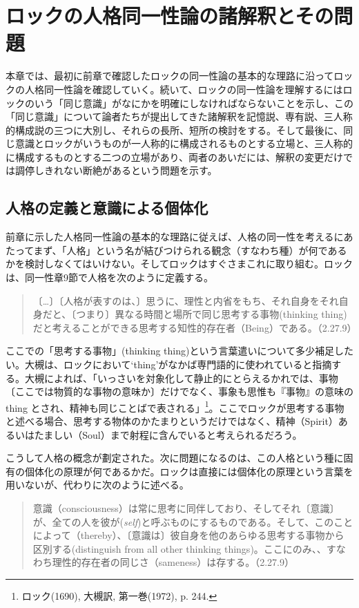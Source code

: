 \documentclass[a4j,oneside]{jsbook}
\begin{document}
\chapter{
ロックの人格同一性論の諸解釈とその問題
}
本章では、最初に前章で確認したロックの同一性論の基本的な理路に沿ってロックの人格同一性論を確認していく。続いて、ロックの同一性論を理解するにはロックのいう「同じ意識」がなにかを明確にしなければならないことを示し、この「同じ意識」について論者たちが提出してきた諸解釈を記憶説、専有説、三人称的構成説の三つに大別し、それらの長所、短所の検討をする。そして最後に、同じ意識とロックがいうものが一人称的に構成されるものとする立場と、三人称的に構成するものとする二つの立場があり、両者のあいだには、解釈の変更だけでは調停しきれない断絶があるという問題を示す。
\section{
人格の定義と意識による個体化
}
前章に示した人格同一性論の基本的な理路に従えば、人格の同一性を考えるにあたってまず、「人格」という名が結びつけられる観念（すなわち種）が何であるかを検討しなくてはいけない。そしてロックはすぐさまこれに取り組む。ロックは、同一性章9節で人格を次のように定義する。
\begin{quote}
〔…〕〔人格が表すのは、〕思うに、理性と内省をもち、それ自身をそれ自身だと、〔つまり〕異なる時間と場所で同じ思考する事物(thinking thing)だと考えることができる思考する知性的存在者（Being）である。（2.27.9）
\end{quote}
ここでの「思考する事物」(thinking thing)という言葉遣いについて多少補足したい。大槻は、ロックにおいて‘thing’がなかば専門語的に使われていると指摘する。大槻によれば、「いっさいを対象化して静止的にとらえるかれでは、事物〔ここでは物質的な事物の意味か〕だけでなく、事象も思惟も『事物』の意味の thing とされ、精神も同じことばで表される」\footnote{ロック(1690), 大槻訳, 第一巻(1972), p. 244.}。ここでロックが思考する事物と述べる場合、思考する物体のかたまりというだけではなく、精神（Spirit）あるいはたましい（Soul）まで射程に含んでいると考えられるだろう。
\par
こうして人格の概念が劃定された。次に問題になるのは、この人格という種に固有の個体化の原理が何であるかだ。ロックは直接には個体化の原理という言葉を用いないが、代わりに次のように述べる。
\begin{quote}
意識（consciousness）は常に思考に同伴しており、そしてそれ〔意識〕が、全ての人を彼が({\itshape self})と呼ぶものにするものである。そして、このことによって（thereby）、〔意識は〕彼自身を他のあらゆる思考する事物から区別する(distinguish from all other thinking things)。ここにのみ、、すなわち理性的存在者の同じさ（sameness）は存する。（2.27.9）
\end{quote}
\end{document}
